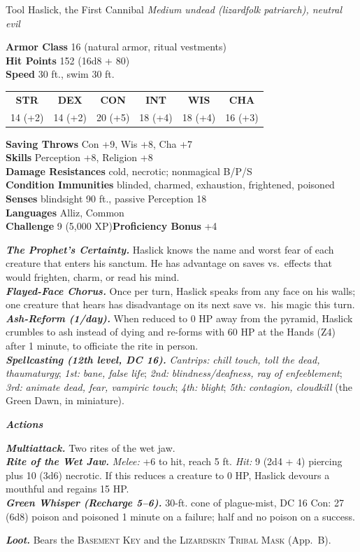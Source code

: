 \documentclass[10pt,twoside]{article}
\newcommand{\abilities}[6]{%
\begin{center}\small
\setlength{\tabcolsep}{6pt}\renewcommand{\arraystretch}{1.05}
\begin{tabular}{cccccc}
\textbf{STR}&\textbf{DEX}&\textbf{CON}&\textbf{INT}&\textbf{WIS}&\textbf{CHA}\\[1pt]
#1&#2&#3&#4&#5&#6\\
\end{tabular}\end{center}}
\newcommand{\sbrule}{\par\vspace{2pt}\noindent{\color{bloodred}\rule{\linewidth}{1.1pt}}\par\vspace{2pt}}
\newcommand{\eqname}[1]{\textsc{#1}}
\begin{document}
\begin{statblock}{Tool Haslick, the First Cannibal}
\textit{Medium undead (lizardfolk patriarch), neutral evil}\sbrule
\textbf{Armor Class} 16 (natural armor, ritual vestments)\\
\textbf{Hit Points} 152 (16d8 + 80)\\
\textbf{Speed} 30 ft., swim 30 ft.\sbrule
\abilities{14 (+2)}{14 (+2)}{20 (+5)}{18 (+4)}{18 (+4)}{16 (+3)}
\sbrule
\textbf{Saving Throws} Con +9, Wis +8, Cha +7\\
\textbf{Skills} Perception +8, Religion +8\\
\textbf{Damage Resistances} cold, necrotic; nonmagical B/P/S\\
\textbf{Condition Immunities} blinded, charmed, exhaustion, frightened, poisoned\\
\textbf{Senses} blindsight 90 ft., passive Perception 18\\
\textbf{Languages} Alliz, Common\\
\textbf{Challenge} 9 (5,000 XP)\hfill\textbf{Proficiency Bonus} +4\sbrule
\textbf{\textit{The Prophet's Certainty.}} Haslick knows the name and worst fear of
each creature that enters his sanctum. He has advantage on saves vs.\ effects that
would frighten, charm, or read his mind.\\
\textbf{\textit{Flayed-Face Chorus.}} Once per turn, Haslick speaks from any face on
his walls; one creature that hears has disadvantage on its next save vs.\ his magic
this turn.\\
\textbf{\textit{Ash-Reform (1/day).}} When reduced to 0 HP away from the pyramid,
Haslick crumbles to ash instead of dying and re-forms with 60 HP at the Hands (Z4)
after 1 minute, to officiate the rite in person.\\
\textbf{\textit{Spellcasting (12th level, DC 16).}} \emph{Cantrips:} \textit{chill
touch, toll the dead, thaumaturgy}; \emph{1st:} \textit{bane, false life};
\emph{2nd:} \textit{blindness/deafness, ray of enfeeblement}; \emph{3rd:}
\textit{animate dead, fear, vampiric touch}; \emph{4th:} \textit{blight};
\emph{5th:} \textit{contagion, cloudkill} (the Green Dawn, in miniature).\sbrule
\textit{\textbf{Actions}}\par
\textbf{\textit{Multiattack.}} Two rites of the wet jaw.\\
\textbf{\textit{Rite of the Wet Jaw.}} \textit{Melee:} +6 to hit, reach 5 ft.
\textit{Hit:} 9 (2d4 + 4) piercing plus 10 (3d6) necrotic. If this reduces a creature
to 0 HP, Haslick devours a mouthful and regains 15 HP.\\
\textbf{\textit{Green Whisper (Recharge 5--6).}} 30-ft. cone of plague-mist, DC 16 Con:
27 (6d8) poison and poisoned 1 minute on a failure; half and no poison on a success.\sbrule
\textbf{\textit{Loot.}} Bears the \eqname{Basement Key} and the \eqname{Lizardskin
Tribal Mask} (App.\ B).
\end{statblock}
\end{document}

